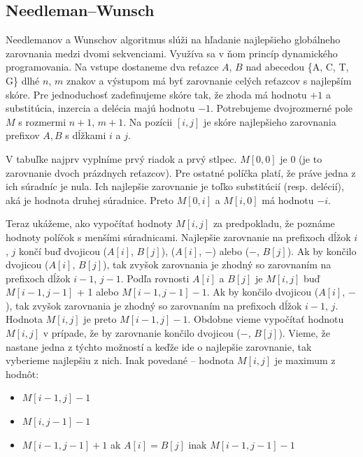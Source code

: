 \subsection{Needleman–Wunsch}

Needlemanov a Wunschov algoritmus slúži na hľadanie najlepšieho globálneho zarovnania medzi dvomi sekvenciami. Využíva sa v ňom princíp dynamického programovania. Na vstupe dostaneme dva reťazce $A$, $B$ nad abecedou \{A, C, T, G\} dlhé $n$, $m$ znakov a výstupom má byť zarovnanie celých reťazcov s najlepším skóre. Pre jednoduchosť zadefinujeme skóre tak, že zhoda má hodnotu $+1$ a substitúcia, inzercia a delécia majú hodnotu $-1$. Potrebujeme dvojrozmerné pole $M$ s rozmermi $n+1$, $m+1$. Na pozícii $[i, j]$ je skóre najlepšieho zarovnania prefixov $A, B$ s dĺžkami $i$ a $j$. 

V tabuľke najprv vyplníme prvý riadok a prvý stlpec. $M[0, 0]$ je 0 (je to zarovnanie dvoch prázdnych reťazcov). Pre ostatné políčka platí, že práve jedna z ich súradníc je nula. Ich najlepšie zarovnanie je toľko substitúcií (resp. delécií), aká je hodnota druhej súradnice. Preto $M[0, i]$ a $M[i, 0]$ má hodnotu $-i$.

Teraz ukážeme, ako vypočítať hodnoty $M[i, j]$ za predpokladu, že poznáme hodnoty políčok s menšími súradnicami. Najlepšie zarovnanie na prefixoch dĺžok $i$, $j$ končí buď dvojicou ($A[i]$, $B[j]$), ($A[i]$, $-$) alebo ($-$, $B[j]$). Ak by končilo dvojicou ($A[i]$, $B[j]$), tak zvyšok zarovnania je zhodný so zarovnaním na prefixoch dĺžok $i - 1$, $j - 1$. Podľa rovnosti $A[i]$ a $B[j]$ je $M[i, j]$ buď $M[i - 1, j - 1]$ + 1 alebo $M[i - 1, j - 1] - 1$. Ak by končilo dvojicou ($A[i]$, $-$), tak zvyšok zarovnania je zhodný so zarovnaním na prefixoch dĺžok $i - 1$, $j$. Hodnota $M[i, j]$ je preto $M[i - 1, j] - 1$. Obdobne vieme vypočítať hodnotu $M[i, j]$ v prípade, že by zarovnanie končilo dvojicou ($-$, $B[j]$). Vieme, že nastane jedna z týchto možností a keďže ide o najlepšie zarovnanie, tak vyberieme najlepšiu z nich. Inak povedané -- hodnota $M[i, j]$ je maximum z hodnôt:

\begin{itemize}
    \item $M[i - 1, j] - 1 $
    \item $M[i, j - 1] - 1 $
    \item $M[i - 1, j - 1] + 1$ ak $A[i] = B[j]$ inak $M[i - 1, j - 1] - 1$
\end{itemize}

